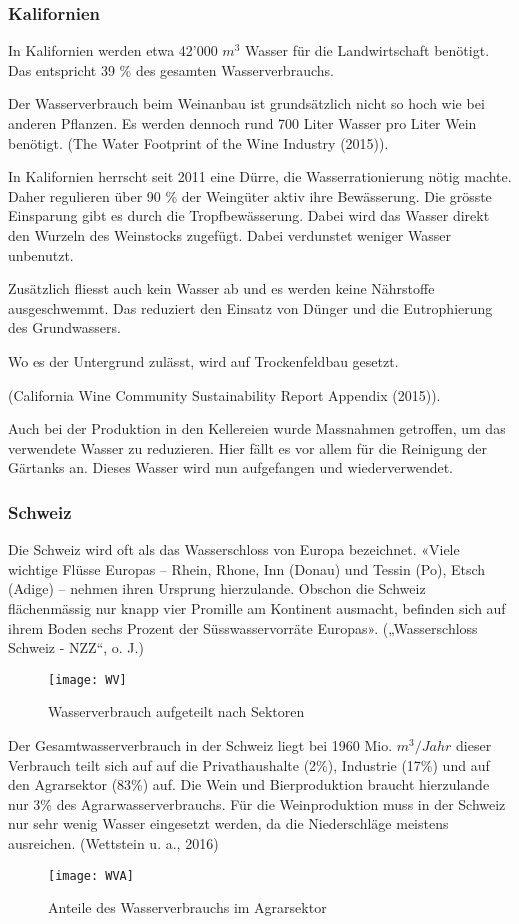 \subsubsection{Kalifornien}
\label{sub:wasserverbrauch}

In Kalifornien werden etwa 42'000 $m^3$ Wasser für die Landwirtschaft benötigt. Das entspricht  39 \% des gesamten
Wasserverbrauchs. 

Der Wasserverbrauch beim Weinanbau ist grundsätzlich nicht so hoch wie bei anderen Pflanzen. Es
werden dennoch rund 700 Liter Wasser pro Liter Wein benötigt.
(\glqq{}The Water Footprint of the Wine Industry\grqq{} (2015)). 

In Kalifornien
herrscht seit 2011 eine Dürre, die Wasserrationierung nötig machte. Daher regulieren über 90 \% der
Weingüter aktiv ihre Bewässerung. Die grösste Einsparung gibt es durch die Tropfbewässerung. Dabei
wird das Wasser direkt den Wurzeln  des Weinstocks zugefügt. Dabei verdunstet weniger Wasser
unbenutzt.

Zusätzlich fliesst auch kein Wasser ab und es werden keine Nährstoffe ausgeschwemmt. Das reduziert
den Einsatz von Dünger und die Eutrophierung des Grundwassers.

Wo es der Untergrund zulässt, wird auf Trockenfeldbau gesetzt.

(\glqq{}California Wine Community Sustainability Report Appendix\grqq{} (2015)).


Auch bei der Produktion in den Kellereien wurde Massnahmen getroffen, um das verwendete Wasser zu
reduzieren. Hier fällt es vor allem für die Reinigung der Gärtanks an. Dieses Wasser wird nun
aufgefangen und wiederverwendet.


\subsubsection{Schweiz}
Die Schweiz wird oft als das Wasserschloss von Europa bezeichnet. «Viele wichtige Flüsse Europas – Rhein, Rhone, Inn (Donau) und Tessin (Po), Etsch (Adige) – nehmen ihren Ursprung hierzulande. Obschon die Schweiz flächenmässig nur knapp vier Promille am Kontinent ausmacht, befinden sich auf ihrem Boden sechs Prozent der Süsswasservorräte Europas». („Wasserschloss Schweiz - NZZ“, o. J.)
 \begin{figure}[H]
	\centering
	\texttt{[image: WV]}
	\caption{Wasserverbrauch aufgeteilt nach Sektoren}
\end{figure}
 Der Gesamtwasserverbrauch in der Schweiz liegt bei 1960 Mio. $m^3/Jahr$ dieser Verbrauch teilt sich auf auf die Privathaushalte (2\%), Industrie (17\%) und auf den Agrarsektor (83\%) auf. Die Wein und Bierproduktion braucht hierzulande nur 3\% des Agrarwasserverbrauchs. Für die Weinproduktion muss in der Schweiz nur sehr wenig Wasser eingesetzt werden, da die Niederschläge meistens ausreichen. (Wettstein u. a., 2016)
  \begin{figure}[H]
	\centering
	\texttt{[image: WVA]}
	\caption{Anteile des Wasserverbrauchs im       Agrarsektor}
\end{figure}
 
